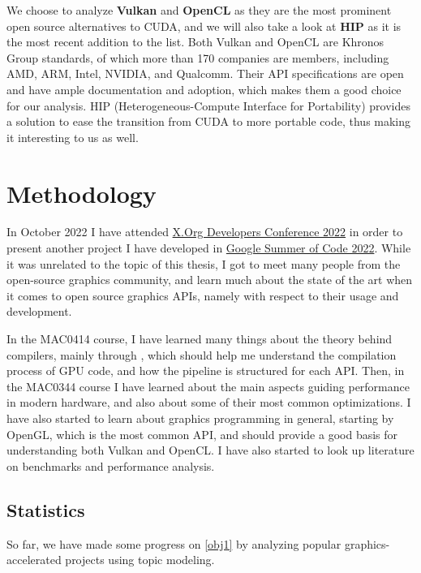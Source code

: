 \documentclass[conference, onecolumn]{IEEEtran}
\begin{document}
We choose to analyze \textbf{Vulkan} and \textbf{OpenCL} as they are the most
prominent open source alternatives to CUDA, and we will also take a look at
\textbf{HIP} as it is the most recent addition to the list.
Both Vulkan and OpenCL are Khronos Group standards, of which more than 170
companies are members, including AMD, ARM, Intel, NVIDIA, and Qualcomm.
Their API specifications are open and have ample documentation and adoption,
which makes them a good choice for our analysis.
HIP (Heterogeneous-Compute Interface for Portability) provides a solution to
ease the transition from CUDA to more portable code, thus making it interesting
to us as well.

\section{Methodology} \label{sec:methodology}

In October 2022 I have attended
\href{https://indico.freedesktop.org/event/2/page/11-overview}{X.Org Developers Conference 2022}
in order to present another project I have developed in
\href{https://summerofcode.withgoogle.com/programs/2022/projects/6AoBcunH}{Google Summer of Code 2022}.
While it was unrelated to the topic of this thesis, I got to meet many people
from the open-source graphics community, and learn much about the state of the
art when it comes to open source graphics APIs, namely with respect to their
usage and development.

In the MAC0414 course, I have learned many things about the theory behind
compilers, mainly through \cite{sipser1996introduction}, which should help me
understand the compilation process of GPU code, and how the pipeline is
structured for each API.
Then, in the MAC0344 course I have learned about the main aspects guiding
performance in modern hardware, and also about some of their most common
optimizations.
I have also started to learn about graphics programming in general, starting by
OpenGL, which is the most common API, and should provide a good basis for
understanding both Vulkan and OpenCL.
I have also started to look up literature on benchmarks and performance
analysis.

\subsection{Statistics} \label{sec:methodology:statistics}

So far, we have made some progress on \cref{obj1} by analyzing popular
graphics-accelerated projects using topic modeling.
\end{document}
